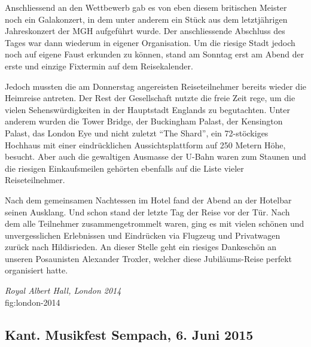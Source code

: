 \begin{history}
    Anschliessend an den Wettbewerb gab es von eben diesem britischen Meister
    noch ein Galakonzert, in dem unter anderem ein Stück aus dem letztjährigen
    Jahreskonzert der MGH aufgeführt wurde. Der anschliessende Abschluss des
    Tages war dann wiederum in eigener Organisation. Um die riesige Stadt jedoch
    noch auf eigene Faust erkunden zu können, stand am Sonntag erst am Abend der
    erste und einzige Fixtermin auf dem Reisekalender.

    Jedoch mussten die am Donnerstag angereisten Reiseteilnehmer bereits wieder
    die Heimreise antreten. Der Rest der Gesellschaft nutzte die freie Zeit
    rege, um die vielen Sehenswürdigkeiten in der Hauptstadt Englands zu
    begutachten. Unter anderem wurden die Tower Bridge, der Buckingham Palast,
    der Kensington Palast, das London Eye und nicht zuletzt \enquote{The Shard},
    ein 72-stöckiges Hochhaus mit einer eindrücklichen Aussichtsplattform auf
    250 Metern Höhe, besucht. Aber auch die gewaltigen Ausmasse der U-Bahn waren
    zum Staunen und die riesigen Einkaufsmeilen gehörten ebenfalls auf die Liste
    vieler Reiseteilnehmer.

    Nach dem gemeinsamen Nachtessen im Hotel fand der Abend an der Hotelbar
    seinen Ausklang. Und schon stand der letzte Tag der Reise vor der Tür. Nach
    dem alle Teilnehmer zusammengetrommelt waren, ging es mit vielen schönen und
    unvergesslichen Erlebnissen und Eindrücken via Flugzeug und Privatwagen
    zurück nach Hildisrieden. An dieser Stelle geht ein riesiges Dankeschön an
    unseren Posaunisten Alexander Troxler, welcher diese Jubiläums-Reise perfekt
    organisiert hatte.

\end{history}

{\emph{Royal Albert Hall, London 2014}\\
} {fig:london-2014}


\subsection*{Kant. Musikfest Sempach, 6. Juni 2015}

